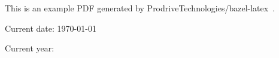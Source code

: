 This is an example PDF generated by ProdriveTechnologies/bazel-latex~\cite{github}.

Current date: \today\par
Current year: \the\year